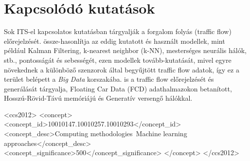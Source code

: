 \documentclass[acmtog, authorversion]{acmart}
\begin{document}
\section{Kapcsolódó kutatások}
Sok ITS-el kapcsolatos kutatásban tárgyalják a forgalom folyás (traffic flow) előrejelzését. \cite{PAUL2017177} össze-hasonlítja az eddig
kutatott és használt modellek, mint például Kalman Filtering, k-nearest neighbor (k-NN), mesterséges neurális hálók, stb., pontosságát és
sebességét, ezen modellek tovább-kutatását, mivel egyre növekednek a különböző szenzorok által  begyűjtött traffic flow adatok, így ez a terület belépett
a \emph{Big Data} korszakába. \cite{10.1371/journal.pone.0253868} is a traffic flow előrejelzését és generálását tárgyalja, Floating Car Data (FCD) 
adathalmazokon betanított, Hosszú-Rövid-Távú memóriájú és Generatív versengő hálókkal.




\begin{CCSXML}
    <ccs2012>
        <concept>
            <concept_id>10010147.10010257.10010293</concept_id>
            <concept_desc>Computing methodologies~Machine learning approaches</concept_desc>
            <concept_significance>500</concept_significance>
            </concept>
    </ccs2012>
\end{CCSXML}
\end{document}
